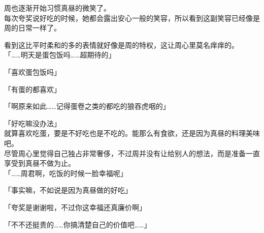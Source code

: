 周也逐渐开始习惯真昼的微笑了。\\

每次夸奖说好吃的时候，她都会露出安心一般的笑容，所以看到这副笑容已经像是周的日常一样了。

看到这比平时柔和的多的表情就好像是周的特权，这让周心里莫名痒痒的。\\

「……明天是蛋包饭吗……超期待的」

「喜欢蛋包饭吗」

「有蛋的都喜欢」

「啊原来如此……记得蛋卷之类的都吃的狼吞虎咽的」

「好吃嘛没办法」\\

就算喜欢吃蛋，要是不好吃也是不吃的。能那么有食欲，还是因为真昼的料理美味吧。\\

尽管周心里觉得自己独占非常奢侈，不过周并没有让给别人的想法，而是准备一直享受到真昼不做为止。\\

「……周君啊，吃饭的时候一脸幸福呢」

「事实嘛，不如说是因为真昼做的好吃」

「夸奖是谢谢啦，不过你这幸福还真廉价啊」

「不不还挺贵的……你搞清楚自己的价值吧……」\\

